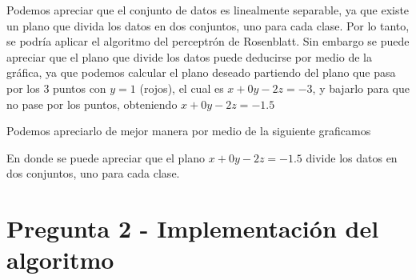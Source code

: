 \documentclass{article}
\theoremstyle{mytheoremstyle}
\theoremstyle{mytheoremstyle}
\theoremstyle{myproblemstyle}
\begin{document}
\begin{enumerate}[label=(\alph*)]
        Podemos apreciar que el conjunto de datos es linealmente separable, ya que  existe un plano que divida los datos en dos conjuntos, uno para cada clase. Por lo tanto, se podría aplicar el algoritmo del perceptrón de Rosenblatt. Sin embargo se puede apreciar que el plano que divide los datos puede deducirse por medio de la gráfica, ya que podemos calcular el plano deseado partiendo del plano que pasa por los 3 puntos con $y=1$ (rojos), el cual es $x+0y-2z=-3$, y bajarlo para que no pase por los puntos, obteniendo $x+0y-2z=-1.5$

        Podemos apreciarlo de mejor manera por medio de la siguiente graficamos

        \begin{center}

        \end{center}

        En donde se puede apreciar que el plano $x+0y-2z=-1.5$ divide los datos en dos conjuntos, uno para cada clase.

\end{enumerate}

\section{Pregunta 2 - Implementación del algoritmo}
\end{document}
